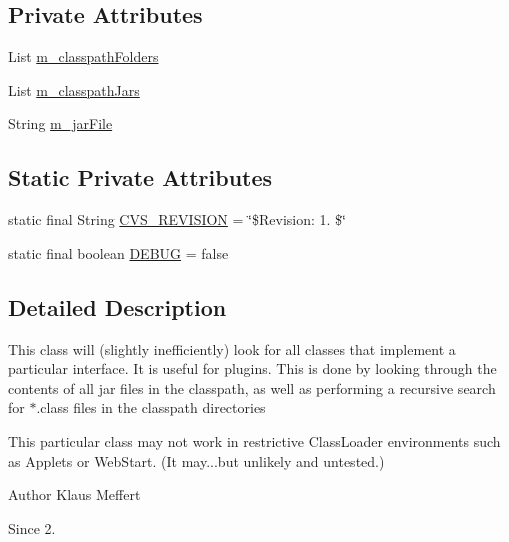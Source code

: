 \subsection*{Private Attributes}
\begin{DoxyCompactItemize}
\item 
List \hyperlink{classorg_1_1jgap_1_1util_1_1_plugin_discoverer_a323a9570d75ed8205d69d8f5c785bb73}{m\-\_\-classpath\-Folders}
\item 
List \hyperlink{classorg_1_1jgap_1_1util_1_1_plugin_discoverer_a8ec8f977e92750122b6a67780238e8e2}{m\-\_\-classpath\-Jars}
\item 
String \hyperlink{classorg_1_1jgap_1_1util_1_1_plugin_discoverer_a5b6575c6f464171001c919aa23944fec}{m\-\_\-jar\-File}
\end{DoxyCompactItemize}
\subsection*{Static Private Attributes}
\begin{DoxyCompactItemize}
\item 
static final String \hyperlink{classorg_1_1jgap_1_1util_1_1_plugin_discoverer_a6b0e92ff50135d1e259f7e44cf692058}{C\-V\-S\-\_\-\-R\-E\-V\-I\-S\-I\-O\-N} = \char`\"{}\$Revision\-: 1. \$\char`\"{}
\item 
static final boolean \hyperlink{classorg_1_1jgap_1_1util_1_1_plugin_discoverer_adc9a10b57d7574fb5cc677f93ad79398}{D\-E\-B\-U\-G} = false
\end{DoxyCompactItemize}


\subsection{Detailed Description}
This class will (slightly inefficiently) look for all classes that implement a particular interface. It is useful for plugins. This is done by looking through the contents of all jar files in the classpath, as well as performing a recursive search for $\ast$.class files in the classpath directories

This particular class may not work in restrictive Class\-Loader environments such as Applets or Web\-Start. (It may...but unlikely and untested.)

\begin{DoxyAuthor}{Author}
Klaus Meffert 
\end{DoxyAuthor}
\begin{DoxySince}{Since}
2. 
\end{DoxySince}


